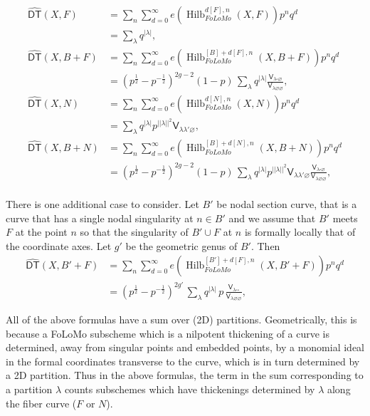 \documentclass[12pt]{amsart}
\newcommand{\Vsf}{\mathsf{V}}
\newcommand{\bx}{\square}
\renewcommand{\emptyset}{\varnothing}
\newcommand{\half}{\frac{1}{2}}
\theoremstyle{definition}
\newcommand{\DThat}{\operatorname{\widehat{\mathsf{DT}}}}
\newcommand{\Hilb}{\operatorname{Hilb}}
\newcommand{\folomo}{{FoLoMo }}
\begin{document}
\begin{align*}
\DThat (X,F)&= \sum_{n}\sum_{d=0}^{\infty} e\left(\Hilb_{\folomo}^{d[F],n}(X,F) \right)p^{n}q^{d}\\
&= \sum_{\lambda} q^{|\lambda |},\\
\DThat (X,B+F)&= \sum_{n}\sum_{d=0}^{\infty} e\left(\Hilb_{\folomo}^{[B]+d[F],n}(X,B+F) \right)p^{n}q^{d}\\
&= \left(p^{\half}-p^{-\half} \right)^{2g-2} (1-p) \, \sum_{\lambda}
q^{|\lambda |} \frac{\Vsf_{\lambda \bx
\emptyset}}{\Vsf_{\lambda \emptyset \emptyset}},\\
\DThat (X,N)&= \sum_{n}\sum_{d=0}^{\infty} e\left(\Hilb_{\folomo}^{d[N],n}(X,N) \right)p^{n}q^{d}\\
&= \sum_{\lambda} q^{|\lambda |} p^{||\lambda ||^{2}} \Vsf_{\lambda \lambda' \emptyset },\\
\DThat (X,B+N)&= \sum_{n}\sum_{d=0}^{\infty} e\left(\Hilb_{\folomo}^{[B]+d[N],n}(X,B+N) \right)p^{n}q^{d}\\
&= \left(p^{\half}-p^{-\half} \right)^{2g-2} (1-p) \, \sum_{\lambda}
q^{|\lambda |} p^{||\lambda ||^{2}} \Vsf_{\lambda \lambda' \emptyset
}\frac{\Vsf_{\lambda \bx
\emptyset}}{\Vsf_{\lambda \emptyset \emptyset}},\\
\end{align*}

There is one additional case to consider.  Let $B'$ be nodal section
curve, that is a curve that has a single nodal singularity at $n\in
B'$ and we assume that $B'$ meets $F$ at the point $n$ so that the
singularity of $B'\cup F$ at $n$ is formally locally that of the
coordinate axes. Let $g'$ be the geometric genus of $B'$. Then
\begin{align*}
\DThat (X,B'+F)&= \sum_{n}\sum_{d=0}^{\infty}
e\left(\Hilb_{\folomo  }^{[B']+d[F],n}(X,B'+F) \right)p^{n}q^{d}\\
&= \left(p^{\half}-p^{-\half} \right)^{2g'} \, \sum_{\lambda}
q^{|\lambda |}\,p\, \frac{\Vsf_{\lambda \bx \bx}}{\Vsf_{\lambda \emptyset
\emptyset}},
\end{align*}

All of the above formulas have a sum over (2D)
partitions. Geometrically, this is because a \folomo subscheme which
is a nilpotent thickening of a curve is determined, away from singular
points and embedded points, by a monomial ideal in the formal
coordinates transverse to the curve, which is in turn determined by a
2D partition. Thus in the above formulas, the term in the sum
corresponding to a partition $\lambda$ counts subschemes which have
thickenings determined by $\lambda$ along the fiber curve ($F$ or
$N$).
\end{document}
